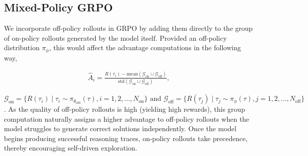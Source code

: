 \documentclass{article}
\begin{document}



\subsection{Mixed-Policy GRPO}
\label{sec:mix-grpo}
We incorporate off-policy rollouts in GRPO by adding them directly to the group of on-policy rollouts generated by the model itself.
Provided an off-policy distribution $\pi_{\phi}$, this would affect the advantage computations in the following way, 


\begin{equation}
    \begin{gathered}
\hat{A}_i = \frac{R(\tau_i) - \text{mean}(\mathcal{G}_{\text{on}} \cup \mathcal{G}_{\text{off}})}{\text{std}(\mathcal{G}_{\text{on}} \cup \mathcal{G}_{\text{off}})}, 
\end{gathered}
\end{equation}

 $\mathcal{G}_{\text{on}} = \{R(\tau_i) \mid \tau_i \sim \pi_{\theta_{\text{old}}}(\tau), i = 1,2,\ldots,N_{\text{on}}\} \text{ and }\mathcal{G}_{\text{off}} = \{R(\tau_j) \mid \tau_j \sim \pi_\phi(\tau), j = 1,2,\ldots,N_{\text{off}}\}$. 
As the quality of off-policy rollouts is high (yielding high rewards), this group computation naturally assigns a higher advantage to off-policy rollouts when the model struggles to generate correct solutions independently. Once the model begins producing successful reasoning traces, on-policy rollouts take precedence, thereby encouraging self-driven exploration.
\end{document}
